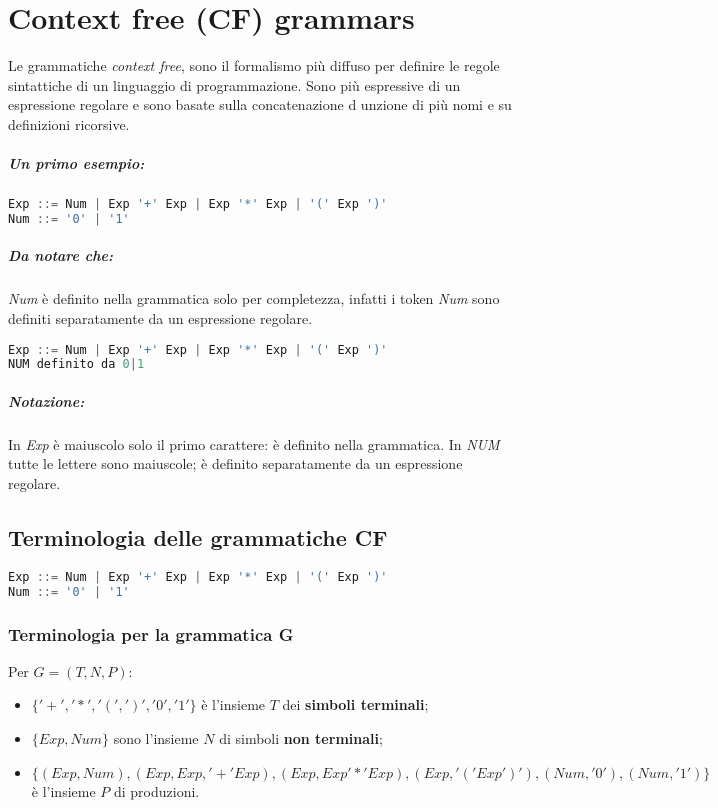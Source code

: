 \chapter{Context free (CF) grammars}
Le grammatiche \emph{context free}, sono il formalismo più diffuso per definire
le regole sintattiche di un linguaggio di programmazione.
Sono più espressive di un espressione regolare e sono basate sulla
concatenazione d unzione di più nomi e su definizioni ricorsive.

\paragraph{Un primo esempio:}
\begin{lstlisting}[language=Java, caption={Una grammatica \textbf{CF} per espressioni semplici}]
Exp ::= Num | Exp '+' Exp | Exp '*' Exp | '(' Exp ')'
Num ::= '0' | '1'
\end{lstlisting}

\paragraph{Da notare che:}
\emph{Num} è definito nella grammatica solo per completezza, infatti i token
\emph{Num} sono definiti separatamente da un espressione regolare.

\begin{lstlisting}[language=Java, caption={Esempio rivisitato di una grammatica
\textbf{CF} per espressioni semplici}]
Exp ::= Num | Exp '+' Exp | Exp '*' Exp | '(' Exp ')'
NUM definito da 0|1
\end{lstlisting}

\paragraph{Notazione:}
In \emph{Exp} è maiuscolo solo il primo carattere: è definito nella grammatica.
In \emph{NUM} tutte le lettere sono maiuscole; è definito separatamente da un
espressione regolare.

\section{Terminologia delle grammatiche CF}
\begin{lstlisting}[language=Java, caption={Esempio}]
Exp ::= Num | Exp '+' Exp | Exp '*' Exp | '(' Exp ')'
Num ::= '0' | '1'
\end{lstlisting}

\subsection{Terminologia per la grammatica G}
Per $G=(T,N,P)$:
\begin{itemize}
  \item $\{'+','*','(',')','0','1'\}$ è l'insieme $T$ dei \textbf{simboli
    terminali};
  \item $\{Exp,Num\}$ sono l'insieme $N$ di simboli \textbf{non terminali};
  \item $\{(Exp,Num),(Exp,Exp,'+'Exp),(Exp,Exp '*'Exp),(Exp,'('Exp')'),(Num,'0'
    ),(Num,'1')\}$ è l'insieme $P$ di produzioni.
\end{itemize}
